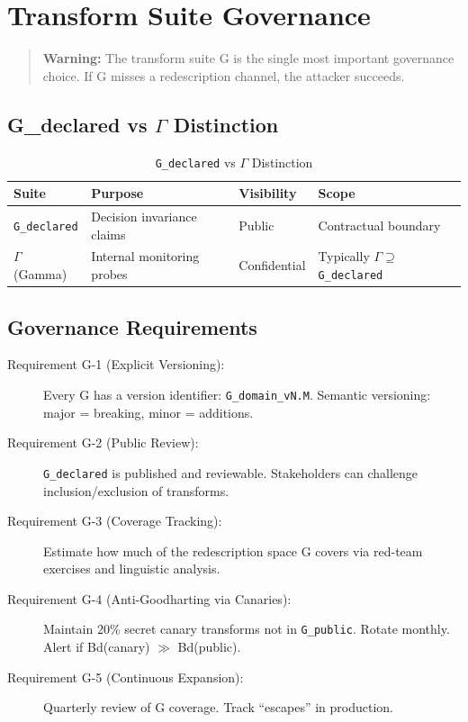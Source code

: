 \documentclass[11pt,letterpaper]{article}
\theoremstyle{definition}
\theoremstyle{remark}
\begin{document}
\section{Transform Suite Governance}

\begin{quote}
\textbf{Warning:} The transform suite G is the single most important governance choice. If G misses a redescription channel, the attacker succeeds.
\end{quote}

\subsection{G\_declared vs $\Gamma$ Distinction}

\begin{table}[h]
\centering
\begin{tabular}{@{}llll@{}}
\toprule
\textbf{Suite} & \textbf{Purpose} & \textbf{Visibility} & \textbf{Scope} \\
\midrule
\texttt{G\_declared} & Decision invariance claims & Public & Contractual boundary \\
$\Gamma$ (Gamma) & Internal monitoring probes & Confidential & Typically $\Gamma \supseteq$ \texttt{G\_declared} \\
\bottomrule
\end{tabular}
\caption{\texttt{G\_declared} vs $\Gamma$ Distinction}
\end{table}

\subsection{Governance Requirements}

\begin{description}
\item[Requirement G-1 (Explicit Versioning):] Every G has a version identifier: \texttt{G\_domain\_vN.M}. Semantic versioning: major = breaking, minor = additions.
\item[Requirement G-2 (Public Review):] \texttt{G\_declared} is published and reviewable. Stakeholders can challenge inclusion/exclusion of transforms.
\item[Requirement G-3 (Coverage Tracking):] Estimate how much of the redescription space G covers via red-team exercises and linguistic analysis.
\item[Requirement G-4 (Anti-Goodharting via Canaries):] Maintain 20\% secret canary transforms not in \texttt{G\_public}. Rotate monthly. Alert if Bd(canary) $\gg$ Bd(public).
\item[Requirement G-5 (Continuous Expansion):] Quarterly review of G coverage. Track ``escapes'' in production.
\end{description}
\end{document}
